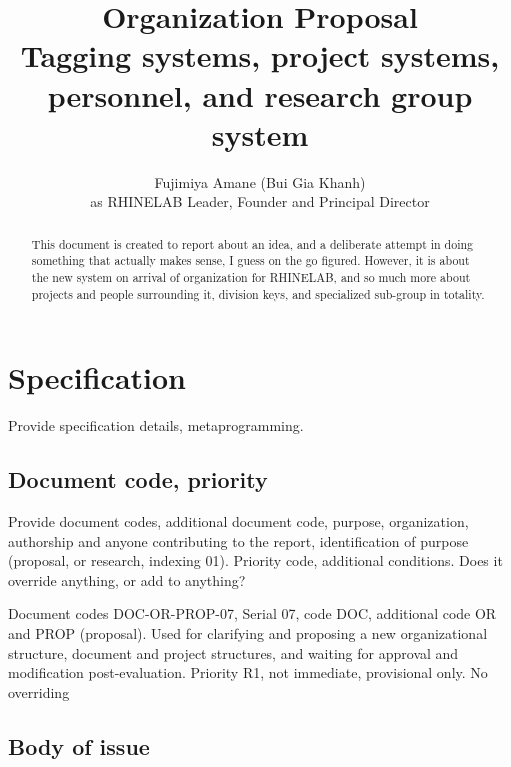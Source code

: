 \documentclass[10pt,a4paper]{article}
\title{\textbf{Organization Proposal} \\ Tagging systems, project systems, personnel, and research group system} %
\author{Fujimiya Amane (Bui Gia Khanh) \\ {\small as RHINELAB Leader, Founder and Principal Director}} %
\affiliation{} %
\begin{document}
\maketitle

\begin{abstract}
    \noindent
    This document is created to report about an idea, and a deliberate attempt in doing something that actually makes sense, I guess on the go figured. However, it is about the new system on arrival of organization for RHINELAB, and so much more about projects and people surrounding it, division keys, and specialized sub-group in totality. 

\end{abstract}

\vspace{2.5cm}



\thispagestyle{firstpage}

\pagebreak


\newgeometry{} %

\section{Specification}
\label{sec:spec}

Provide specification details, metaprogramming. 

\subsection{Document code, priority}

{\footnotesize
Provide document codes, additional document code, purpose, organization, authorship and anyone contributing to the report, identification of purpose (proposal, or research, indexing 01). Priority code, additional conditions. Does it override anything, or add to anything?
}

Document codes DOC-OR-PROP-07, Serial 07, code DOC, additional code OR and PROP (proposal). Used for clarifying and proposing a new organizational structure, document and project structures, and waiting for approval and modification post-evaluation. Priority R1, not immediate, provisional only. No overriding

\subsection{Body of issue}
\end{document}
